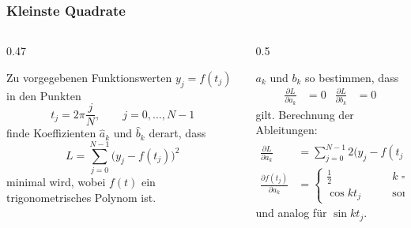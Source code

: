 %
%
\begin{frame}
\frametitle{Kleinste Quadrate}
\begin{columns}
\begin{column}{0.47\hsize}
\begin{leastsquares}
Zu vorgegebenen Funktionswerten $y_j=f(t_j)$ in den Punkten
\[
t_j = 2\pi \frac{j}{N},\qquad j=0,\dots,N-1
\]
finde Koeffizienten $\hat a_k$ und $\hat b_k$ derart, dass
\[
L=\sum_{j=0}^{N-1} \bigl(y_j - f(t_j)\bigr)^2
\]
minimal wird, wobei $f(t)$ ein trigonometrisches Polynom ist.
\end{leastsquares}
\end{column}
\begin{column}{0.5\hsize}
\begin{loesung}
$a_k$ und $b_k$ so bestimmen, dass
\begin{align*}
\frac{\partial L}{\partial a_k}&=0&
\frac{\partial L}{\partial b_k}&=0
\end{align*}
gilt.
Berechnung der Ableitungen:
\begin{align*}
\frac{\partial L}{\partial a_k}
&=
\sum_{j=0}^{N-1}2\bigl(y_j-f(t_j)\bigr)
\frac{\partial f(t_j)}{\partial a_k}
\\
\frac{\partial f(t_j)}{\partial a_k}
&=
\begin{cases}
\frac12&\qquad k=0
\\
\cos kt_j&\qquad\text{sonst}
\end{cases}
\end{align*}
und analog für $\sin kt_j$.
\end{loesung}
\end{column}
\end{columns}
\end{frame}

